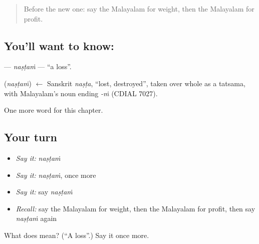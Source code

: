 \begin{quote}
Before the new one: say the Malayalam for weight, then the Malayalam for profit.
\end{quote}

\subsection*{You'll want to know: }
\textbf{} — \emph{naṣṭaṁ} — \textquotedblleft{}a loss\textquotedblright{}.

\begin{cousinweb}
\textbf{} (\emph{naṣṭaṁ}) $\leftarrow$ Sanskrit \emph{naṣṭa}, \textquotedblleft{}lost, destroyed\textquotedblright{}, taken over whole as a tatsama, with Malayalam's noun ending \emph{-ṁ} (CDIAL 7027).
\end{cousinweb}

\begin{grammarlens}[title={What you've built}]
One more word for this chapter.
\end{grammarlens}

\subsection*{Your turn}
\begin{itemize}
\raggedright
  \item \emph{Say it:} \emph{naṣṭaṁ}
  \item \emph{Say it:} \emph{naṣṭaṁ}, once more
  \item \emph{Say it:} say \emph{naṣṭaṁ}
  \item \emph{Recall:} say the Malayalam for weight, then the Malayalam for profit, then say \emph{naṣṭaṁ} again
\end{itemize}

\begin{tcolorbox}[breakable,colback=teal!4,colframe=teal!35!black,title={Before you move on}]
What does  mean? (\textquotedblleft{}A loss\textquotedblright{}.) Say it once more.
\end{tcolorbox}
